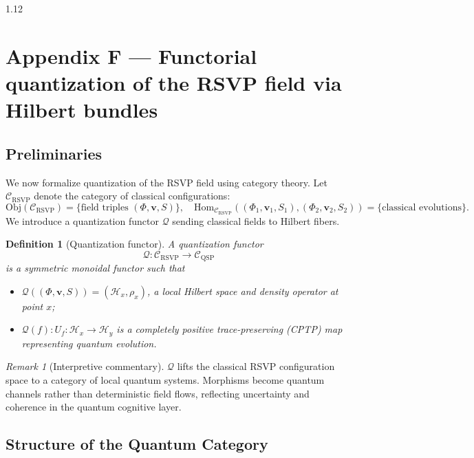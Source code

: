 \documentclass[12pt,a4paper]{article}
\numberwithin{equation}{section}
\newtheorem{definition}{Definition}[section]
\theoremstyle{remark}
\newtheorem{remark}{Remark}[section]
\theoremstyle{definition}
\begin{document}
\begin{spacing}{1.12}
\section*{Appendix F — Functorial quantization of the RSVP field via Hilbert bundles}

\subsection{Preliminaries}\label{sec:F-prelim}
We now formalize quantization of the RSVP field using category theory.  
Let $\mathcal{C}_{\mathrm{RSVP}}$ denote the category of classical configurations:
\[
\mathrm{Obj}(\mathcal{C}_{\mathrm{RSVP}}) = \{\text{field triples }(\Phi,\mathbf{v},S)\}, \quad
\mathrm{Hom}_{\mathcal{C}_{\mathrm{RSVP}}}((\Phi_1,\mathbf{v}_1,S_1),(\Phi_2,\mathbf{v}_2,S_2)) = \{\text{classical evolutions}\}.
\]
We introduce a quantization functor $\mathcal{Q}$ sending classical fields to Hilbert fibers.

\begin{definition}[Quantization functor]\label{def:F-Qfunctor}
A \emph{quantization functor}
\[
\mathcal{Q}:\mathcal{C}_{\mathrm{RSVP}}\to\mathcal{C}_{\mathrm{QSP}}
\]
is a symmetric monoidal functor such that
\begin{itemize}
    \item $\mathcal{Q}((\Phi,\mathbf{v},S))=(\mathcal{H}_x,\rho_x)$, a local Hilbert space and density operator at point $x$;
    \item $\mathcal{Q}(f):U_f:\mathcal{H}_x\to\mathcal{H}_y$ is a completely positive trace-preserving (CPTP) map representing quantum evolution.
\end{itemize}
\end{definition}

\begin{remark}[Interpretive commentary]
$\mathcal{Q}$ lifts the classical RSVP configuration space to a category of local quantum systems. Morphisms become quantum channels rather than deterministic field flows, reflecting uncertainty and coherence in the quantum cognitive layer.
\end{remark}

\subsection{Structure of the Quantum Category}\label{sec:F-structure}


\end{spacing}
\end{document}
